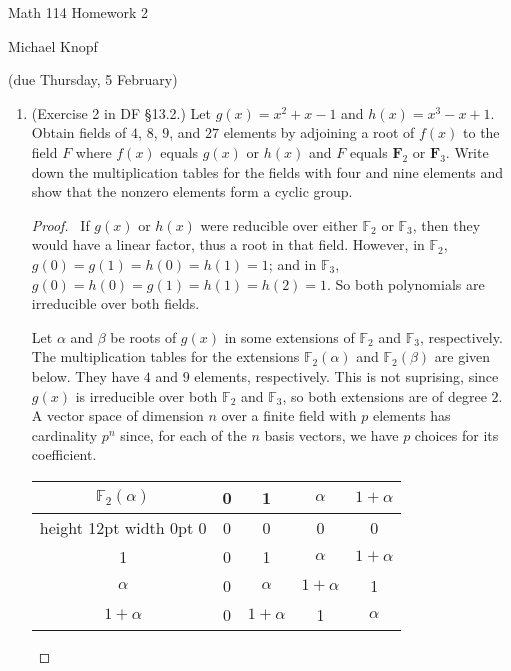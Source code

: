 \documentclass[10pt]{article}
\begin{document}
\begin{center}
\large Math 114 Homework 2

\normalsize Michael Knopf

\normalsize (due Thursday, 5 February)
\end{center}

\begin{enumerate}[leftmargin=0cm,itemindent=.5cm,labelwidth=\itemindent,labelsep=0cm,align=left]

\item (Exercise 2 in DF \S 13.2.) Let $g(x)=x^2+x-1$ and $h(x)=x^3-x+1$.  Obtain fields of $4$, $8$, $9$, and $27$ elements by adjoining a root of $f(x)$ to the field $F$ where $f(x)$ equals $g(x)$ or $h(x)$ and $F$ equals $\mathbf{F}_2$ or $\mathbf{F}_3$.  Write down the multiplication tables for the fields with four and nine elements and show that the nonzero elements form a cyclic group.

\begin{proof}
\ If $g(x)$ or $h(x)$ were reducible over either $\mathbb{F}_2$ or $\mathbb{F}_3$, then they would have a linear factor, thus a root in that field.  However, in $\mathbb{F}_2$, $g(0) = g(1) = h(0) = h(1) = 1$; and in $\mathbb{F}_3$, $g(0) = h(0) = g(1) = h(1) = h(2) = 1$.  So both polynomials are irreducible over both fields.

Let $\alpha$ and $\beta$ be roots of $g(x)$ in 
some extensions of $\mathbb{F}_2$ and $\mathbb{F}_3$, respectively.  The multiplication tables for the extensions $\mathbb{F}_2(\alpha)$ and $\mathbb{F}_2(\beta)$ are given below.  They have $4$ and $9$ elements, respectively.  This is not suprising, since $g(x)$ is irreducible over both $\mathbb{F}_2$ and $\mathbb{F}_3$, so both extensions are of degree $2$.  A vector space of dimension $n$ over a finite field with $p$ elements has cardinality $p^n$ since, for each of the $n$ basis vectors, we have $p$ choices for its coefficient.

\begin{center}

\begin{tabular}{c|cccc}
$\mathbb{F}_2(\alpha)$  & 0 & 1 & $\alpha$ & $1+\alpha$ \\
\hline\vrule height 12pt width 0pt
0 & 0 & 0 & 0 & 0 \\ 
1 & 0 & 1 & $\alpha$ & $1+\alpha$ \\ 
$\alpha$ & 0 & $\alpha$ & $1+\alpha$ & 1 \\ 
$1+\alpha$ & 0 & $1+\alpha$ & 1 & $\alpha$ \\ 
\end{tabular}


\end{center}
\end{proof}
\end{enumerate}
\end{document}
